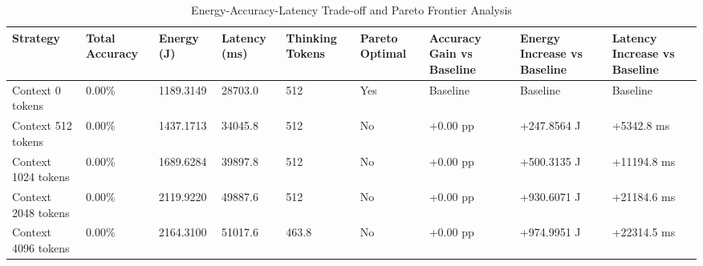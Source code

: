\begin{table}
\caption{Energy-Accuracy-Latency Trade-off and Pareto Frontier Analysis}
\label{tab:tradeoff_comparison}
\begin{tabular}{lllllllll}
\toprule
Strategy & Total Accuracy & Energy (J) & Latency (ms) & Thinking Tokens & Pareto Optimal & Accuracy Gain vs Baseline & Energy Increase vs Baseline & Latency Increase vs Baseline \\
\midrule
Context 0 tokens & 0.00\% & 1189.3149 & 28703.0 & 512 & Yes & Baseline & Baseline & Baseline \\
Context 512 tokens & 0.00\% & 1437.1713 & 34045.8 & 512 & No & +0.00 pp & +247.8564 J & +5342.8 ms \\
Context 1024 tokens & 0.00\% & 1689.6284 & 39897.8 & 512 & No & +0.00 pp & +500.3135 J & +11194.8 ms \\
Context 2048 tokens & 0.00\% & 2119.9220 & 49887.6 & 512 & No & +0.00 pp & +930.6071 J & +21184.6 ms \\
Context 4096 tokens & 0.00\% & 2164.3100 & 51017.6 & 463.8 & No & +0.00 pp & +974.9951 J & +22314.5 ms \\
\bottomrule
\end{tabular}
\end{table}
